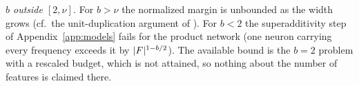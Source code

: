 \emph{$b$ outside $[2,\nu]$.} For $b>\nu$ the normalized margin is unbounded as the width grows (cf.\ the unit-duplication argument of \citealp[Sec.~3.2]{neyshabur2015norm}). For $b<2$ the superadditivity step of Appendix~\ref{app:models} fails for the product network (one neuron carrying every frequency exceeds it by $|F|^{1-b/2}$). The available bound is the $b=2$ problem with a rescaled budget, which is not attained, so nothing about the number of features is claimed there.
